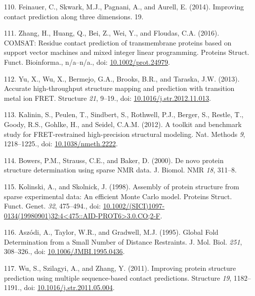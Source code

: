\documentclass[11pt,a4paper,twoside]{book}
\theoremstyle{definition}
\theoremstyle{definition}
\theoremstyle{remark}
\begin{document}
\hypertarget{ref-Feinauer2014}{}
110. Feinauer, C., Skwark, M.J., Pagnani, A., and Aurell, E. (2014).
Improving contact prediction along three dimensions. 19.

\hypertarget{ref-Zhang2016}{}
111. Zhang, H., Huang, Q., Bei, Z., Wei, Y., and Floudas, C.A. (2016).
COMSAT: Residue contact prediction of transmembrane proteins based on
support vector machines and mixed integer linear programming. Proteins
Struct. Funct. Bioinforma., n/a--n/a., doi:
\href{https://doi.org/10.1002/prot.24979}{10.1002/prot.24979}.

\hypertarget{ref-Yu2013}{}
112. Yu, X., Wu, X., Bermejo, G.A., Brooks, B.R., and Taraska, J.W.
(2013). Accurate high-throughput structure mapping and prediction with
transition metal ion FRET. Structure \emph{21}, 9--19., doi:
\href{https://doi.org/10.1016/j.str.2012.11.013}{10.1016/j.str.2012.11.013}.

\hypertarget{ref-Kalinin2012}{}
113. Kalinin, S., Peulen, T., Sindbert, S., Rothwell, P.J., Berger, S.,
Restle, T., Goody, R.S., Gohlke, H., and Seidel, C.A.M. (2012). A
toolkit and benchmark study for FRET-restrained high-precision
structural modeling. Nat. Methods \emph{9}, 1218--1225., doi:
\href{https://doi.org/10.1038/nmeth.2222}{10.1038/nmeth.2222}.

\hypertarget{ref-Bowers2000}{}
114. Bowers, P.M., Strauss, C.E., and Baker, D. (2000). De novo protein
structure determination using sparse NMR data. J. Biomol. NMR \emph{18},
311--8.

\hypertarget{ref-Kolinski1998}{}
115. Kolinski, A., and Skolnick, J. (1998). Assembly of protein
structure from sparse experimental data: An efficient Monte Carlo model.
Proteins Struct. Funct. Genet. \emph{32}, 475--494., doi:
\href{https://doi.org/10.1002/(SICI)1097-0134(19980901)32:4\%3C475::AID-PROT6\%3E3.0.CO;2-F}{10.1002/(SICI)1097-0134(19980901)32:4\textless{}475::AID-PROT6\textgreater{}3.0.CO;2-F}.

\hypertarget{ref-Aszodi1995a}{}
116. Aszódi, A., Taylor, W.R., and Gradwell, M.J. (1995). Global Fold
Determination from a Small Number of Distance Restraints. J. Mol. Biol.
\emph{251}, 308--326., doi:
\href{https://doi.org/10.1006/JMBI.1995.0436}{10.1006/JMBI.1995.0436}.

\hypertarget{ref-Wu2011}{}
117. Wu, S., Szilagyi, A., and Zhang, Y. (2011). Improving protein
structure prediction using multiple sequence-based contact predictions.
Structure \emph{19}, 1182--1191., doi:
\href{https://doi.org/10.1016/j.str.2011.05.004}{10.1016/j.str.2011.05.004}.
\end{document}
